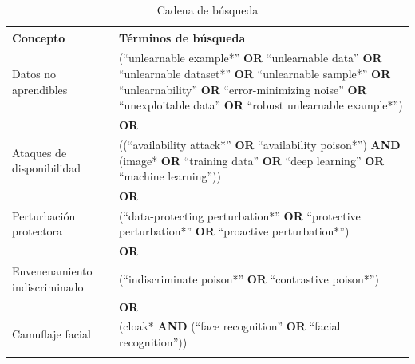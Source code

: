 \begin{table}[t]
\caption{Cadena de búsqueda}\label{tab:cadena}
\footnotesize
\begin{tabularx}{\textwidth}{@{}L{3.2cm}Y{1.0}@{}}
\toprule
Concepto & Términos de búsqueda \\
\midrule
Datos no aprendibles & (``unlearnable example*'' \textbf{OR} ``unlearnable data'' \textbf{OR} ``unlearnable dataset*'' \textbf{OR} ``unlearnable sample*'' \textbf{OR} ``unlearnability'' \textbf{OR} ``error-minimizing noise'' \textbf{OR} ``unexploitable data'' \textbf{OR} ``robust unlearnable example*'') \\
 & \textbf{OR} \\
Ataques de disponibilidad & ((``availability attack*'' \textbf{OR} ``availability poison*'') \textbf{AND} (image* \textbf{OR} ``training data'' \textbf{OR} ``deep learning'' \textbf{OR} ``machine learning'')) \\
 & \textbf{OR} \\
Perturbación protectora & (``data-protecting perturbation*'' \textbf{OR} ``protective perturbation*'' \textbf{OR} ``proactive perturbation*'') \\
 & \textbf{OR} \\
Envenenamiento indiscriminado & (``indiscriminate poison*'' \textbf{OR} ``contrastive poison*'') \\
 & \textbf{OR} \\
Camuflaje facial & (cloak* \textbf{AND} (``face recognition'' \textbf{OR} ``facial recognition'')) \\
\botrule
\end{tabularx}
\end{table}
